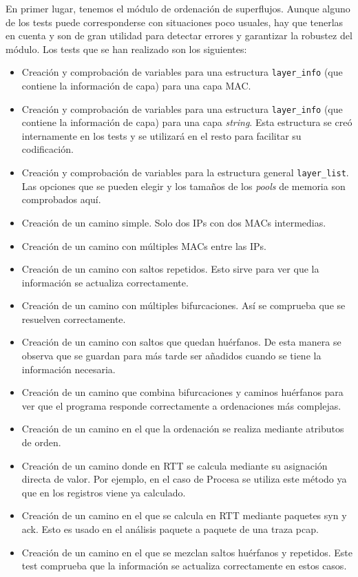 \documentclass[tfg,epsbased,lof,lot,loa,covers,final,copyright,overleaf]{tfgtfmthesisuam}
\begin{document}
En primer lugar, tenemos el módulo de ordenación de superflujos. Aunque alguno de los tests puede corresponderse con situaciones poco usuales, hay que tenerlas en cuenta y son de gran utilidad para detectar errores y garantizar la robustez del módulo. Los tests que se han realizado son los siguientes:

\begin{itemize}
	\item Creación y comprobación de variables para una estructura \texttt{layer\_info} (que contiene la información de capa) para una capa MAC.
	\item Creación y comprobación de variables para una estructura \texttt{layer\_info} (que contiene la información de capa) para una capa \textit{string}. Esta estructura se creó internamente en los tests y se utilizará en el resto para facilitar su codificación.
	\item Creación y comprobación de variables para la estructura general \texttt{layer\_list}. Las opciones que se pueden elegir y los tamaños de los \textit{pools} de memoria son comprobados aquí.
	\item Creación de un camino simple. Solo dos IPs con dos MACs intermedias.
	\item Creación de un camino con múltiples MACs entre las IPs.
	\item Creación de un camino con saltos repetidos. Esto sirve para ver que la información se actualiza correctamente.
	\item Creación de un camino con múltiples bifurcaciones. Así se comprueba que se resuelven correctamente.
	\item Creación de un camino con saltos que quedan huérfanos. De esta manera se observa que se guardan para más tarde ser añadidos cuando se tiene la información necesaria.
	\item Creación de un camino que combina bifurcaciones y caminos huérfanos para ver que el programa responde correctamente a ordenaciones más complejas.
	\item Creación de un camino en el que la ordenación se realiza mediante atributos de orden.
	\item Creación de un camino donde en RTT se calcula mediante su asignación directa de valor. Por ejemplo, en el caso de Procesa se utiliza este método ya que en los registros viene ya calculado.
	\item Creación de un camino en el que se calcula en RTT mediante paquetes \gls{syn} y \gls{ack}. Esto es usado en el análisis paquete a paquete de una traza pcap.
	\item Creación de un camino en el que se mezclan saltos huérfanos y repetidos. Este test comprueba que la información se actualiza correctamente en estos casos.
\end{itemize}
\end{document}
